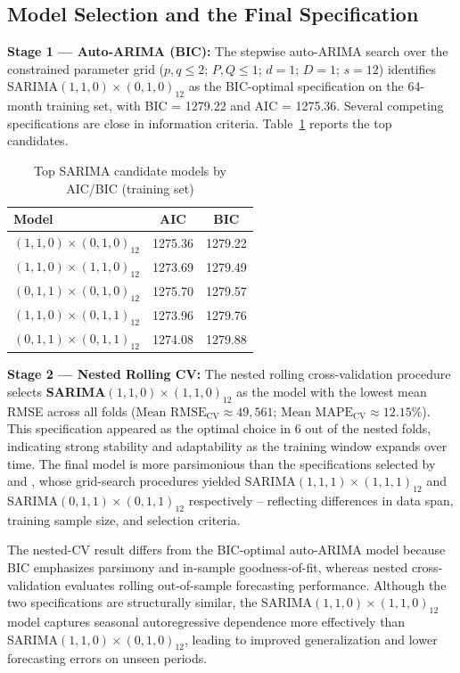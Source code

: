 \documentclass[12pt]{article}
\begin{document}
\subsection{Model Selection and the Final Specification}

\textbf{Stage 1 --- Auto-ARIMA (BIC):} The stepwise auto-ARIMA search over the constrained parameter grid ($p, q \le 2$; $P, Q \le 1$; $d=1$; $D=1$; $s=12$) identifies SARIMA$(1,1,0)\times(0,1,0)_{12}$ as the BIC-optimal specification on the 64-month training set, with BIC = 1279.22 and AIC = 1275.36. Several competing specifications are close in information criteria. Table~\ref{tab:aic_bic} reports the top candidates.

\begin{table}[H]
\centering
\caption{Top SARIMA candidate models by AIC/BIC (training set)}
\label{tab:aic_bic}
\begin{tabular}{lcc}
\toprule
Model & AIC & BIC \\
\midrule
$(1,1,0)\times(0,1,0)_{12}$ & 1275.36 & 1279.22 \\
$(1,1,0)\times(1,1,0)_{12}$ & 1273.69 & 1279.49 \\
$(0,1,1)\times(0,1,0)_{12}$ & 1275.70 & 1279.57 \\
$(1,1,0)\times(0,1,1)_{12}$ & 1273.96 & 1279.76 \\
$(0,1,1)\times(0,1,1)_{12}$ & 1274.08 & 1279.88 \\
\bottomrule
\end{tabular}
\end{table}

\textbf{Stage 2 --- Nested Rolling CV:} The nested rolling cross-validation procedure selects \textbf{SARIMA$(1,1,0)\times(1,1,0)_{12}$} as the model with the lowest mean RMSE across all folds ($\text{Mean RMSE}_{\text{CV}} \approx 49{,}561$; $\text{Mean MAPE}_{\text{CV}} \approx 12.15\%$). This specification appeared as the optimal choice in 6 out of the nested folds, indicating strong stability and adaptability as the training window expands over time. The final model is more parsimonious than the specifications selected by \citet{chen2025} and \citet{liang2025}, whose grid-search procedures yielded SARIMA$(1,1,1)\times(1,1,1)_{12}$ and SARIMA$(0,1,1)\times(0,1,1)_{12}$ respectively -- reflecting differences in data span, training sample size, and selection criteria.

The nested-CV result differs from the BIC-optimal auto-ARIMA model because BIC emphasizes parsimony and in-sample goodness-of-fit, whereas nested cross-validation evaluates rolling out-of-sample forecasting performance. Although the two specifications are structurally similar, the SARIMA$(1,1,0)\times(1,1,0)_{12}$ model captures seasonal autoregressive dependence more effectively than SARIMA$(1,1,0)\times(0,1,0)_{12}$, leading to improved generalization and lower forecasting errors on unseen periods.
\end{document}
